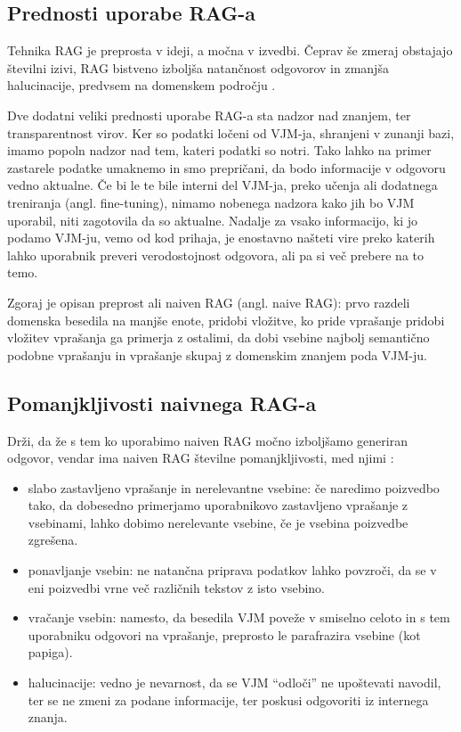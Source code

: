 \documentclass[a4paper,12pt,openright]{book}
\begin{document}
\subsection{Prednosti uporabe RAG-a}

Tehnika RAG je preprosta v ideji, a močna v izvedbi. Čeprav še zmeraj obstajajo številni izivi, RAG bistveno izboljša natančnost odgovorov in zmanjša halucinacije, predvsem na domenskem področju \cite{benchmarking_rag}.

Dve dodatni veliki prednosti uporabe RAG-a sta nadzor nad znanjem, ter transparentnost virov. Ker so podatki ločeni od VJM-ja, shranjeni v zunanji bazi, imamo popoln nadzor nad tem, kateri podatki so notri. Tako lahko na primer zastarele podatke umaknemo in smo prepričani, da bodo informacije v odgovoru vedno aktualne. Če bi le te bile interni del VJM-ja, preko učenja ali dodatnega treniranja (angl. fine-tuning), nimamo nobenega nadzora kako jih bo VJM uporabil, niti zagotovila da so aktualne. Nadalje za vsako informacijo, ki jo podamo VJM-ju, vemo od kod prihaja, je enostavno našteti vire preko katerih lahko uporabnik preveri verodostojnost odgovora, ali pa si več prebere na to temo.

Zgoraj je opisan preprost ali naiven RAG \cite{rag} (angl. naive RAG): prvo razdeli domenska besedila na manjše enote, pridobi vložitve, ko pride vprašanje pridobi vložitev vprašanja ga primerja z ostalimi, da dobi vsebine najbolj semantično podobne vprašanju in vprašanje skupaj z domenskim znanjem poda VJM-ju.

\subsection{Pomanjkljivosti naivnega RAG-a}

Drži, da že s tem ko uporabimo naiven RAG močno izboljšamo generiran odgovor, vendar ima naiven RAG številne pomanjkljivosti, med njimi \cite{rag_survey}:

\begin{itemize}
    \item slabo zastavljeno vprašanje in nerelevantne vsebine: če naredimo poizvedbo tako, da dobesedno primerjamo uporabnikovo zastavljeno vprašanje z vsebinami, lahko dobimo nerelevante vsebine, če je vsebina poizvedbe zgrešena.
    \item ponavljanje vsebin: ne natančna priprava podatkov lahko povzroči, da se v eni poizvedbi vrne več različnih tekstov z isto vsebino.
    \item vračanje vsebin: namesto, da besedila VJM poveže v smiselno celoto in s tem uporabniku odgovori na vprašanje, preprosto le parafrazira vsebine (kot papiga).
    \item halucinacije: vedno je nevarnost, da se VJM “odloči” ne upoštevati navodil, ter se ne zmeni za podane informacije, ter poskusi odgovoriti iz internega znanja.
\end{itemize}
\end{document}
